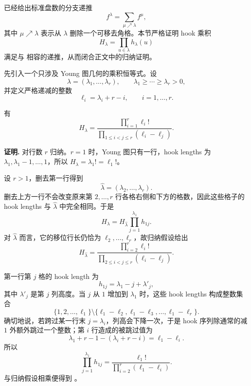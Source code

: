 已经给出标准盘数的分支递推
\begin{equation}
f^\lambda=\sum_{\mu\nearrow\lambda}f^\mu,
\label{eq:hook-recursion-app}
\end{equation}
其中 $\mu\nearrow\lambda$ 表示从 $\lambda$ 删除一个可移去角格。本节严格证明 hook 乘积
\[
H_\lambda=\prod_{u\in\lambda}h_\lambda(u)
\]
满足与  相容的递推，从而闭合正文中的归纳证明。

先引入一个只涉及 Young 图几何的乘积恒等式。设
\[
\lambda=(\lambda_1,\dots,\lambda_r),
\qquad
\lambda_1\ge\cdots\ge\lambda_r>0,
\]
并定义严格递减的整数
\begin{equation}
\ell_i=\lambda_i+r-i,
\qquad i=1,\dots,r.
\label{eq:shifted-row-lengths}
\end{equation}

\begin{lemma}
有
\begin{equation}
H_\lambda
=\frac{\displaystyle\prod_{i=1}^{r}\ell_i!}
{\displaystyle\prod_{1\le i<j\le r}(\ell_i-\ell_j)}.
\label{eq:hook-product-shifted}
\end{equation}

\par\smallskip\noindent\textbf{证明.}
对行数 $r$ 归纳。$r=1$ 时，Young 图只有一行，hook lengths 为 $\lambda_1,\lambda_1-1,\dots,1$，所以 $H_\lambda=\lambda_1!=\ell_1!$。

设 $r>1$，删去第一行得到
\[
\widehat\lambda=(\lambda_2,\dots,\lambda_r).
\]
删去上方一行不会改变原来第 $2,\dots,r$ 行各格右侧和下方的格数，因此这些格子的 hook lengths 与 $\widehat\lambda$ 中完全相同。于是
\[
H_\lambda=H_{\widehat\lambda}\prod_{j=1}^{\lambda_1}h_{1j}.
\]
对 $\widehat\lambda$ 而言，它的移位行长仍恰为 $\ell_2,\dots,\ell_r$，故归纳假设给出
\[
H_{\widehat\lambda}
=\frac{\prod_{i=2}^{r}\ell_i!}
{\prod_{2\le i<j\le r}(\ell_i-\ell_j)}.
\]

第一行第 $j$ 格的 hook length 为
\[
h_{1j}=\lambda_1-j+\lambda'_j,
\]
其中 $\lambda'_j$ 是第 $j$ 列高度。当 $j$ 从 $1$ 增加到 $\lambda_1$ 时，这些 hook lengths 构成整数集合
\[
\{1,2,\dots,\ell_1\}
\setminus
\{\ell_1-\ell_2,\ell_1-\ell_3,\dots,\ell_1-\ell_r\}.
\]
确切地说，若跨过某一行末 $j=\lambda_i$，列高会下降一次，于是 hook 序列除通常的减 $1$ 外额外跳过一个整数；第 $i$ 行造成的被跳过值为
\[
\lambda_1+r-1-(\lambda_i+r-i)=\ell_1-\ell_i.
\]
所以
\[
\prod_{j=1}^{\lambda_1}h_{1j}
=\frac{\ell_1!}{\prod_{i=2}^{r}(\ell_1-\ell_i)}.
\]
与归纳假设相乘便得到 。
\end{lemma}


